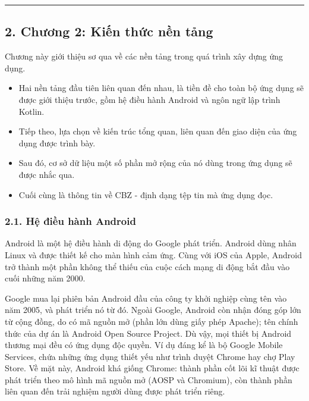 \documentclass[
]{article}
\begin{document}
\begin{center}\rule{0.5\linewidth}{0.5pt}\end{center}

\hypertarget{chux1b0ux1a1ng-2-kiux1ebfn-thux1ee9c-nux1ec1n-tux1ea3ng}{%
\subsection{\texorpdfstring{2. Chương 2: Kiến thức nền tảng
}{2. Chương 2: Kiến thức nền tảng }}\label{chux1b0ux1a1ng-2-kiux1ebfn-thux1ee9c-nux1ec1n-tux1ea3ng}}

Chương này giới thiệu sơ qua về các nền tảng trong quá trình xây dựng
ứng dụng.

\begin{itemize}
\item
  Hai nền tảng đầu tiên liên quan đến nhau, là tiền đề cho toàn bộ ứng
  dụng sẽ được giới thiệu trước, gồm hệ điều hành Android và ngôn ngữ
  lập trình Kotlin.
\item
  Tiếp theo, lựa chọn về kiến trúc tổng quan, liên quan đến giao diện
  của ứng dụng được trình bày.
\item
  Sau đó, cơ sở dữ liệu một số phần mở rộng của nó dùng trong ứng dụng
  sẽ được nhắc qua.
\item
  Cuối cùng là thông tin về CBZ - định dạng tệp tin mà ứng dụng đọc.
\end{itemize}

\hypertarget{hux1ec7-ux111iux1ec1u-huxe0nh-android}{%
\subsubsection{\texorpdfstring{2.1. Hệ điều hành Android
}{2.1. Hệ điều hành Android }}\label{hux1ec7-ux111iux1ec1u-huxe0nh-android}}

Android là một hệ điều hành di động do Google phát triển. Android dùng
nhân Linux và được thiết kế cho màn hình cảm ứng. Cùng với iOS của
Apple, Android trở thành một phần không thể thiếu của cuộc cách mạng di
động bắt đầu vào cuối những năm 2000.

Google mua lại phiên bản Android đầu của công ty khởi nghiệp cùng tên
vào năm 2005, và phát triển nó từ đó. Ngoài Google, Android còn nhận
đóng góp lớn từ cộng đồng, do có mã nguồn mở (phần lớn dùng giấy phép
Apache); tên chính thức của dự án là Android Open Source Project. Dù
vậy, mọi thiết bị Android thương mại đều có ứng dụng độc quyền. Ví dụ
đáng kể là bộ Google Mobile Services, chứa những ứng dụng thiết yếu như
trình duyệt Chrome hay chợ Play Store. Về mặt này, Android khá giống
Chrome: thành phần cốt lõi kĩ thuật được phát triển theo mô hình mã
nguồn mở (AOSP và Chromium), còn thành phần liên quan đến trải nghiệm
người dùng được phát triển riêng.
\end{document}
